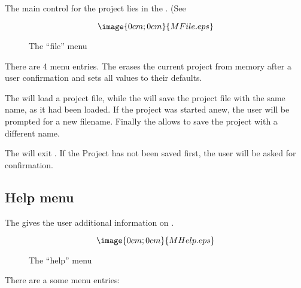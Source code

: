 The main control for the project lies in the
. (See 
\begin{figure}[h]
$$\image{0cm;0cm}{MFile.eps}$$%
\caption{The ``file'' menu}%
\label{basic.file.menu}
\end{figure}

There are 4 menu entries.
The  erases the current project from memory after 
a user confirmation and sets all values to their defaults.

The  will load a project file, while the
 will save the project file with the same name, as
it had been loaded. If the project was started anew, the user 
will be prompted for a new filename.
Finally the  allows to save the 
project with a different name.

The  will exit \period.
If the Project has not been saved first,
the user will be asked for confirmation.


\subsection{Help menu}%
\label{basic.help}

The  gives the user additional information on
\period.

\begin{figure}[h]
$$\image{0cm;0cm}{MHelp.eps}$$%
\caption{The ``help'' menu}%
\label{basic.help.menu}
\end{figure}

There are a some menu entries:


